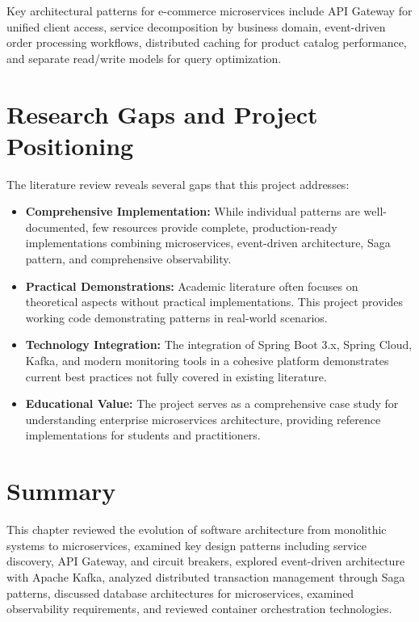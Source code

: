 Key architectural patterns for e-commerce microservices include API Gateway for unified client access, service decomposition by business domain, event-driven order processing workflows, distributed caching for product catalog performance, and separate read/write models for query optimization.

\section{Research Gaps and Project Positioning}

The literature review reveals several gaps that this project addresses:

\begin{itemize}
    \item \textbf{Comprehensive Implementation:} While individual patterns are well-documented, few resources provide complete, production-ready implementations combining microservices, event-driven architecture, Saga pattern, and comprehensive observability.
    
    \item \textbf{Practical Demonstrations:} Academic literature often focuses on theoretical aspects without practical implementations. This project provides working code demonstrating patterns in real-world scenarios.
    
    \item \textbf{Technology Integration:} The integration of Spring Boot 3.x, Spring Cloud, Kafka, and modern monitoring tools in a cohesive platform demonstrates current best practices not fully covered in existing literature.
    
    \item \textbf{Educational Value:} The project serves as a comprehensive case study for understanding enterprise microservices architecture, providing reference implementations for students and practitioners.
\end{itemize}

\section{Summary}

This chapter reviewed the evolution of software architecture from monolithic systems to microservices, examined key design patterns including service discovery, API Gateway, and circuit breakers, explored event-driven architecture with Apache Kafka, analyzed distributed transaction management through Saga patterns, discussed database architectures for microservices, examined observability requirements, and reviewed container orchestration technologies.

